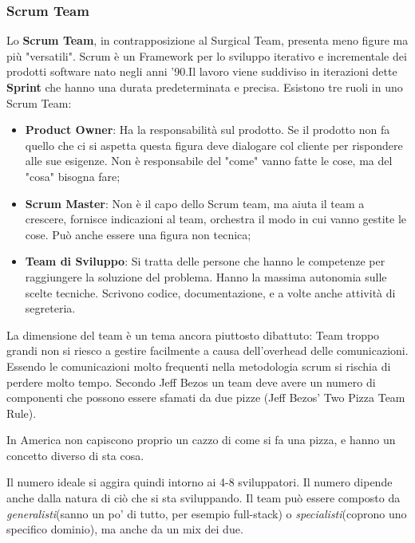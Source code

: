 \subsubsection{Scrum Team}
Lo \textbf{Scrum Team}, in contrapposizione al Surgical Team, presenta meno figure ma più "versatili". Scrum è un Framework per lo sviluppo iterativo e incrementale dei prodotti software nato negli anni '90.\newline Il lavoro viene suddiviso in iterazioni dette \textbf{Sprint} che hanno una durata predeterminata e precisa. Esistono tre ruoli in uno Scrum Team:
\begin{itemize}
	\item \textbf{Product Owner}: Ha la responsabilità sul prodotto. Se il prodotto non fa quello che ci si aspetta questa figura deve dialogare col cliente per rispondere alle sue esigenze. Non è responsabile del "come" vanno fatte le cose, ma del "cosa" bisogna fare;
	\item \textbf{Scrum Master}: Non è il capo dello Scrum team, ma aiuta il team a crescere, fornisce indicazioni al team, orchestra il modo in cui vanno gestite le cose. Può anche essere una figura non tecnica;
	\item \textbf{Team di Sviluppo}: Si tratta delle persone che hanno le competenze per raggiungere la soluzione del problema. Hanno la massima autonomia sulle scelte tecniche. Scrivono codice, documentazione, e a volte anche attività di segreteria.
\end{itemize}
La dimensione del team è un tema ancora piuttosto dibattuto:
Team troppo grandi non si riesco a gestire facilmente a causa dell'overhead delle comunicazioni. Essendo le comunicazioni molto frequenti nella metodologia scrum si rischia di perdere molto tempo.
Secondo Jeff Bezos un team deve avere un numero di componenti che possono essere sfamati da due pizze (Jeff Bezos' Two Pizza Team Rule).
\begin{warn}
	In America non capiscono proprio un cazzo di come si fa una pizza, e hanno un concetto diverso di sta cosa.
\end{warn}
Il numero ideale si aggira quindi intorno ai 4-8 sviluppatori. Il numero dipende anche dalla natura di ciò che si sta sviluppando. Il team può essere composto da \textit{generalisti}(sanno un po' di tutto, per esempio full-stack) o \textit{specialisti}(coprono uno specifico dominio), ma anche da un mix dei due.\newline
